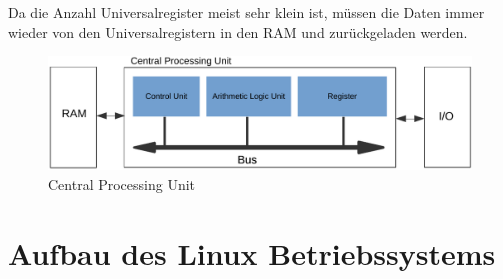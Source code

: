 Da die Anzahl Universalregister meist sehr klein ist, müssen die Daten immer wieder von den Universalregistern in den RAM und zurückgeladen werden.

\begin{figure}[t]
\centering
\includegraphics[width=1.0\textwidth]{images/cpu.pdf}
\caption{Central Processing Unit}
\label{fig:CPU}
\end{figure}

\section{Aufbau des Linux Betriebssystems}

